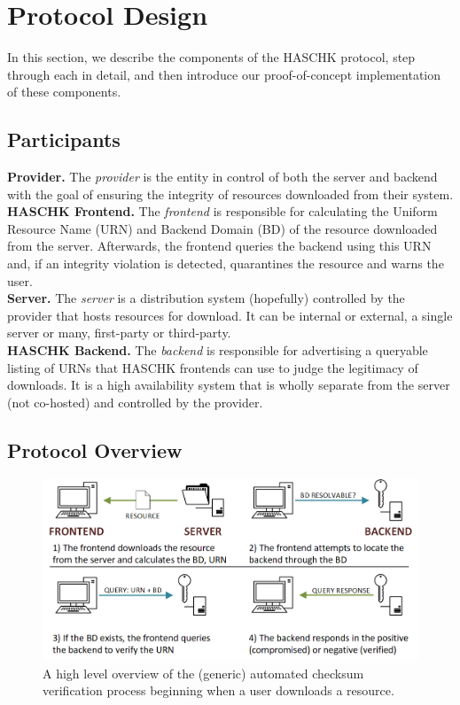 \section{Protocol Design} \label{sec:hc-design}

In this section, we describe the components of the HASCHK protocol, step
through each in detail, and then introduce our proof-of-concept implementation
of these components.

\subsection{Participants}

\noindent\textbf{Provider.} The \emph{provider} is the entity in control of both
the server and backend with the goal of ensuring the integrity of resources
downloaded from their system. \\

\noindent\textbf{HASCHK Frontend.} The \emph{frontend} is responsible for
calculating the Uniform Resource Name (URN) and Backend Domain (BD) of the
resource downloaded from the server. Afterwards, the frontend queries the
backend using this URN and, if an integrity violation is detected, quarantines
the resource and warns the user. \\

\noindent\textbf{Server.} The \emph{server} is a distribution system (hopefully)
controlled by the provider that hosts resources for download. It can be internal
or external, a single server or many, first-party or third-party. \\

\noindent\textbf{HASCHK Backend.} The \emph{backend} is responsible for
advertising a queryable listing of URNs that HASCHK frontends can use to
judge the legitimacy of downloads. It is a high availability system that is
wholly separate from the server (not co-hosted) and controlled by the provider.

\subsection{Protocol Overview}

\begin{figure}[ht]
    \centering
    \includegraphics[width=\linewidth]{figs/hc/haschk-overview.png}
    \caption{A high level overview of the (generic) automated checksum
    verification process beginning when a user downloads a
    resource.} \label{fig:protocol}
\end{figure}

